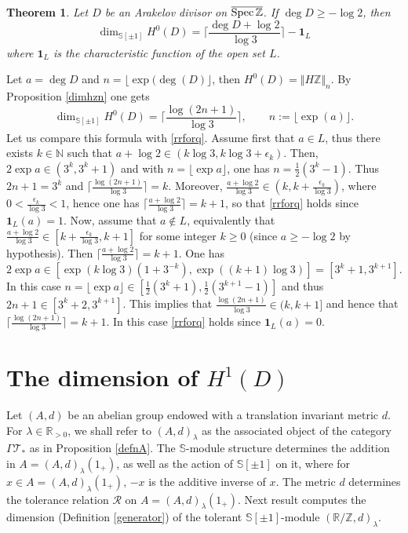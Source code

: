 \documentclass[cupthm]{CUP-JNL-JMJ}
\numberwithin{equation}{section}
\theoremstyle{cupplain}
\newtheorem{theorem}{Theorem}[section]
\theoremstyle{cupdefinition}
\theoremstyle{cupremark}
\theoremstyle{cupproof}
\def\N{{\mathbb N}}
\def\R{{\mathbb R}}
\def\S{{\mathbb S}}
\def\Z{{\mathbb Z}}
\def\cR{{\mathcal R}}
\def\cT{{\mathcal T}}
\def\Spec{{\rm Spec\,}}
\def\sss{{\S}}
\def\spm{{\sss[\pm 1]}}
\def\spzb{{\overline{\Spec\Z}}}
\begin{document}
\begin{theorem} \label{mainth}
Let $D$ be an Arakelov divisor  on $\spzb$. If $\deg D\geq -\log 2$, then
\begin{equation}\label{rrforq}
\dim_{\spm}H^0(D)=\bigg\lceil \frac{\deg D+ \log 2}{\log 3}\bigg\rceil	-{\mathbf 1}_L
\end{equation}
where ${\mathbf 1}_L$ is the characteristic function of the open set $L$. 
\end{theorem}
\proof Let $a=\deg D$ and  $n=\lfloor\exp(\deg(D)\rfloor$, then  $H^0(D)=\Vert H\Z\Vert_n$.  By Proposition \ref{dimhzn} one gets 
\[
\dim_{\spm}H^0(D)=\bigg\lceil \frac{\log(2n+1)}{\log 3}\bigg\rceil, \qquad n:=\lfloor\exp(a)\rfloor.
\]
Let us compare this formula with \eqref{rrforq}. Assume first that $a\in L$, thus there exists $k\in\N$ such that $a+\log 2\in (k\log 3,k\log 3+\epsilon_k)$. Then, $2 \exp a\in (3^k, 3^k+1) $ and with $n=\lfloor \exp a\rfloor$,  one has $n=\frac{1}{2}(3^k-1)$. Thus  $2n+1=3^k$ and 
 $\lceil \frac{\log(2n+1)}{\log 3}\rceil=k$. Moreover,  $\frac{a+\log 2}{\log 3}\in (k,k+\frac{\epsilon_k}{\log 3})$, where $0<\frac{\epsilon_k}{\log 3}<1$, hence one has $\lceil \frac{a+ \log 2}{\log 3}\rceil=k+1$, so that \eqref{rrforq} holds since ${\mathbf 1}_L(a)=1$. Now, assume that $a\notin L$,  equivalently that $\frac{a+\log 2}{\log 3}\in [k+\frac{\epsilon_k}{\log 3},k+1]$ for some integer $k\geq 0$ (since $a\geq- \log 2$ by hypothesis). Then  $\lceil \frac{a+ \log 2}{\log 3}\rceil=k+1$. One has 
 \[
 2 \exp a\in [\exp(k\log 3)(1+3^{-k}),\exp((k+1)\log 3)]=[3^k+1,3^{k+1}].
 \]
 In this case $n=\lfloor\exp a\rfloor\in[\frac{1}{2} (3^k+1),\frac{1}{2}(3^{k+1}-1)]$ and thus $2n+1\in [3^k+2,3^{k+1}]$.
 This implies that $\frac{\log(2n+1)}{\log 3}\in (k,k+1]$ and hence that  $\lceil \frac{\log(2n+1)}{\log 3}\rceil=k+1$. In this case \eqref{rrforq} holds since ${\mathbf 1}_L(a)=0$. \endproof 

\section{The dimension of $H^1(D)$}\label{sec4}
 
 Let $(A,d)$ be an abelian group endowed with a translation invariant metric $d$. For $\lambda\in\R_{>0}$, we shall refer to $(A,d)_\lambda$ as the associated object  of the category $\Gamma\cT_*$ as in Proposition \ref{defnA}. The $\sss$-module structure determines the addition in $A=(A,d)_\lambda(1_+)$, as well as the action of $\spm$ on it, where for $x\in A=(A,d)_\lambda(1_+)$, $-x$ is the additive inverse of $x$. The metric $d$ determines the tolerance relation $\cR$ on $A=(A,d)_\lambda(1_+)$.
 Next result computes the dimension (Definition \ref{generator}) of the tolerant  $\spm$-module $(\R/\Z,d)_\lambda$.
 
\end{document}
